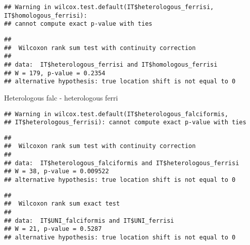 \documentclass[
]{article}
\newenvironment{Shaded}{\begin{snugshade}}{\end{snugshade}}
\newcommand{\FunctionTok}[1]{\textcolor[rgb]{0.00,0.00,0.00}{#1}}
\newcommand{\NormalTok}[1]{#1}
\newcommand{\SpecialCharTok}[1]{\textcolor[rgb]{0.00,0.00,0.00}{#1}}
\begin{document}
\begin{verbatim}
## Warning in wilcox.test.default(IT$heterologous_ferrisi, IT$homologous_ferrisi):
## cannot compute exact p-value with ties
\end{verbatim}

\begin{verbatim}
## 
##  Wilcoxon rank sum test with continuity correction
## 
## data:  IT$heterologous_ferrisi and IT$homologous_ferrisi
## W = 179, p-value = 0.2354
## alternative hypothesis: true location shift is not equal to 0
\end{verbatim}

Heterologous falc - heterologous ferri

\begin{Shaded}
\end{Shaded}

\begin{verbatim}
## Warning in wilcox.test.default(IT$heterologous_falciformis,
## IT$heterologous_ferrisi): cannot compute exact p-value with ties
\end{verbatim}

\begin{verbatim}
## 
##  Wilcoxon rank sum test with continuity correction
## 
## data:  IT$heterologous_falciformis and IT$heterologous_ferrisi
## W = 38, p-value = 0.009522
## alternative hypothesis: true location shift is not equal to 0
\end{verbatim}

\begin{Shaded}
\end{Shaded}

\begin{verbatim}
## 
##  Wilcoxon rank sum exact test
## 
## data:  IT$UNI_falciformis and IT$UNI_ferrisi
## W = 21, p-value = 0.5287
## alternative hypothesis: true location shift is not equal to 0
\end{verbatim}
\end{document}
